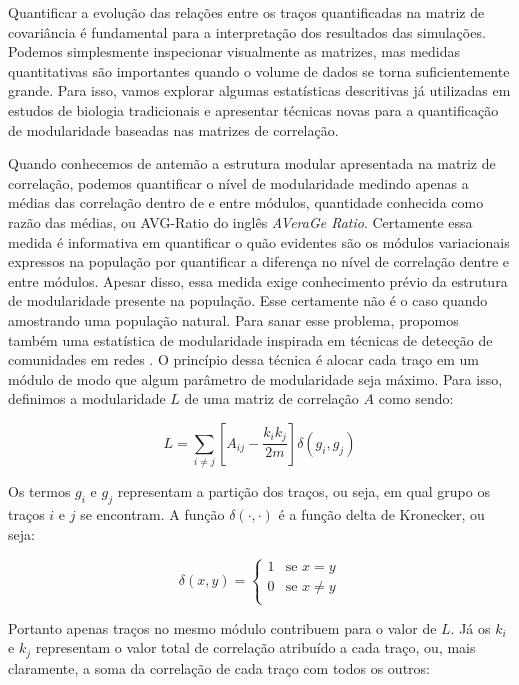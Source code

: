 Quantificar a evolução das relações entre os traços quantificadas na
matriz de covariância é fundamental para a interpretação dos resultados
das simulações. 
Podemos simplesmente inspecionar visualmente as matrizes, mas medidas
quantitativas são importantes quando o volume de dados se torna
suficientemente grande. 
Para isso, vamos explorar algumas estatísticas descritivas já utilizadas em
estudos de biologia tradicionais e apresentar técnicas novas para a
quantificação de modularidade baseadas nas matrizes de correlação.

Quando conhecemos de antemão a estrutura modular apresentada na matriz
de correlação, podemos quantificar o nível de modularidade medindo
apenas a médias das correlação dentro de e entre módulos, quantidade
conhecida como razão das médias, ou AVG-Ratio do inglês {\it AVeraGe Ratio}. 
Certamente essa medida é informativa em quantificar o quão evidentes são
os módulos variacionais expressos na população por quantificar a
diferença no nível de correlação dentre e entre módulos. 
Apesar disso, essa medida exige conhecimento prévio da estrutura de
modularidade presente na população. 
Esse certamente não é o caso quando amostrando uma população natural.
Para sanar esse problema, propomos também uma estatística de
modularidade inspirada em técnicas de detecção de comunidades em redes
\citep{Newman2006,Newman2006a,Reichardt2006}.
O princípio dessa técnica é alocar cada traço em um módulo de modo que
algum parâmetro de modularidade seja máximo.
Para isso, definimos a modularidade $L$ de uma matriz de correlação $A$
como sendo:

\begin{equation}
   L = \sum_{i \neq j} \left[ A_{ij} - \frac{k_ik_j}{2m} \right] \delta(g_i, g_j)
\end{equation}

Os termos $g_i$ e $g_j$ representam a partição dos traços, ou seja, em
qual grupo os traços $i$ e $j$ se encontram. 
A função $\delta(\cdot,\cdot)$ é a função delta de Kronecker, ou seja:

\begin{equation}
   \delta (x,y) = \left \{ 
      \begin{array}{rl}
          1 & \text{se } x = y\\
          0 & \text{se } x \neq y\\
      \end{array} \right.
\end{equation}

Portanto apenas traços no mesmo módulo contribuem para o valor de $L$.
Já os $k_i$ e $k_j$  representam o valor total de correlação atribuído a
cada traço, ou, mais claramente, a soma da correlação de cada traço com
todos os outros:

